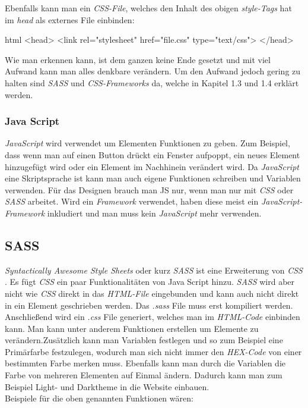 		Ebenfalls kann man ein \textit{CSS-File}, welches den Inhalt des obigen \textit{style-Tags} hat im \textit{head} als externes File einbinden:
		\begin{code}{html}
			<head>
				<link rel="stylesheet" href="file.css" type="text/css">
			</head>
		\end{code}
		Wie man erkennen kann, ist dem ganzen keine Ende gesetzt und mit viel Aufwand kann man alles denkbare verändern. Um den Aufwand jedoch gering zu halten sind \textit{SASS} und \textit{CSS-Frameworks} da, welche in Kapitel 1.3 und 1.4 erklärt werden.
		\subsubsection{Java Script}
		\textit{JavaScript} wird verwendet um Elementen Funktionen zu geben. Zum Beispiel, dass wenn man auf einen Button drückt ein Fenster aufpoppt, ein neues Element hinzugefügt wird oder ein Element im Nachhinein verändert wird. Da \textit{JavaScript} eine Skriptsprache ist kann man auch eigene Funktionen schreiben und Variablen verwenden. Für das Designen brauch man JS nur, wenn man nur mit \textit{CSS} oder \textit{SASS} arbeitet. Wird ein \textit{Framework} verwendet, haben diese meist ein \textit{JavaScript-Framework} inkludiert und man muss kein \textit{JavaScript} mehr verwenden.
	\subsection{SASS}
	\textit{Syntactically Awesome Style Sheets} oder kurz \textit{SASS} ist eine Erweiterung von \textit{CSS} \cite{jump-start-sass}. Es fügt \textit{CSS} ein paar Funktionalitäten von Java Script hinzu. \textit{SASS} wird aber nicht wie \textit{CSS} direkt in das \textit{HTML-File} eingebunden und kann auch nicht direkt in ein Element geschrieben werden. Das \textit{.sass} File muss erst kompiliert werden. Anschließend wird ein \textit{.css} File generiert, welches man im \textit{HTML-Code} einbinden kann. Man kann unter anderem Funktionen erstellen um Elemente zu verändern.Zusätzlich kann man Variablen festlegen und so zum Beispiel eine Primärfarbe festzulegen, wodurch man sich nicht immer den \textit{HEX-Code} von einer bestimmten Farbe merken muss. Ebenfalls kann man durch die Variablen die Farbe von mehreren Elementen auf Einmal ändern. Dadurch kann man zum Beispiel Light- und Darktheme in die Website einbauen.\\Beispiele für die oben genannten Funktionen wären:

